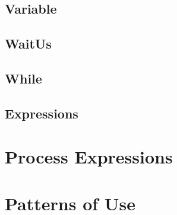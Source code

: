 \subsection{Variable}
\subsection{WaitUs}
\subsection{While}
\subsection{Expressions}

\section{Process Expressions}

\section{Patterns of Use}
